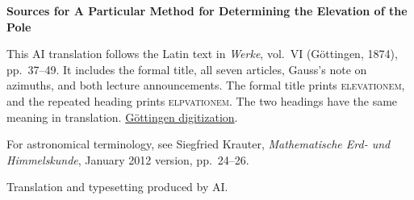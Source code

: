 \clearpage\thispagestyle{empty}
\begin{center}\textbf{Sources for A Particular Method for Determining the Elevation of the Pole}\end{center}
\noindent This AI translation follows the Latin text in \textit{Werke}, vol.~VI (Göttingen, 1874), pp.~37--49. It includes the formal title, all seven articles, Gauss’s note on azimuths, and both lecture announcements. The formal title prints \mbox{\textsc{elevationem}}, and the repeated heading prints \mbox{\textsc{elpvationem}}. The two headings have the same meaning in translation. \href{https://gdz.sub.uni-goettingen.de/id/PPN236007467}{Göttingen digitization}.
\par\smallskip\noindent For astronomical terminology, see Siegfried Krauter, \textit{Mathematische Erd- und Himmelskunde}, January 2012 version, pp.~24--26.
\par\smallskip\noindent Translation and typesetting produced by AI.
\clearpage
